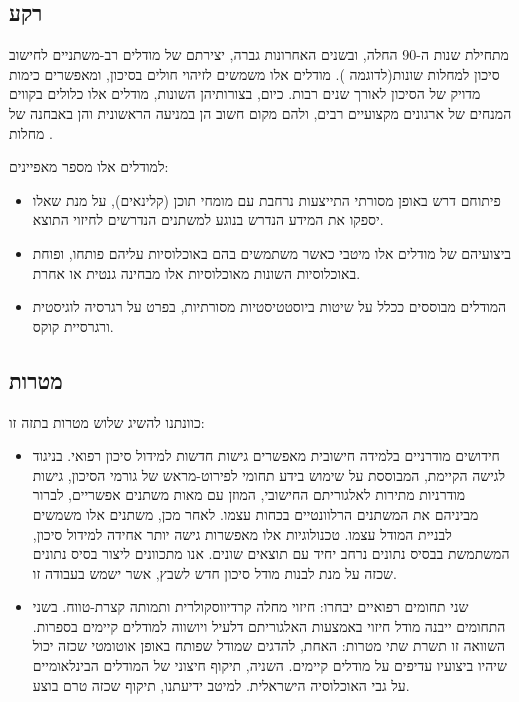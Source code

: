 \documentclass[a4paper,12pt]{article}
\begin{document}
	\begin{hebrew}
		\subsection*{רקע}
		מתחילת שנות ה-90 החלה, ובשנים האחרונות גברה, יצירתם של מודלים רב-משתניים לחישוב סיכון למחלות שונות(לדוגמה \cite{Wilson1998,Conroy2003,DAgostino2008}). מודלים אלו משמשים לזיהוי חולים בסיכון, ומאפשרים כימות מדויק של הסיכון לאורך שנים רבות\cite{Goff2014}. כיום, בצורותיהן השונות, מודלים אלו כלולים בקווים המנחים של ארגונים מקצועיים רבים, ולהם מקום חשוב הן במניעה הראשונית והן באבחנה של מחלות \cite{Graham2007,Goff2014}.
			
			למודלים אלו מספר מאפיינים:
			\begin{itemize}
				\item פיתוחם דרש באופן מסורתי התייצעות נרחבת עם מומחי תוכן (קלינאים), על מנת שאלו יספקו את המידע הנדרש בנוגע למשתנים הנדרשים לחיזוי התוצא.
				\item ביצועיהם של מודלים אלו מיטבי כאשר משתמשים בהם באוכלוסיות עליהם פותחו, ופוחת באוכלוסיות השונות מאוכלוסיות אלו מבחינה גנטית או אחרת\cite{DAgostino2001,Bastuji-Garin2002,DeFilippis2015}.
				
				\item המודלים מבוססים ככלל על שיטות ביוסטטיסטיות מסורתיות, בפרט על רגרסיה לוגיסטית ורגרסיית קוקס.
				
			\end{itemize}
				
		\subsection*{מטרות}
			כוונתנו להשיג שלוש מטרות בתזה זו:
			\begin{itemize}
				\item חידושים מודרניים בלמידה חישובית מאפשרים גישות חדשות למידול סיכון רפואי\cite{Obermeyer2016}. בניגוד לגישה הקיימת, המבוססת על שימוש בידע תחומי לפירוט-מראש של גורמי הסיכון, גישות מודרניות מתירות לאלגוריתם החישובי, המוזן עם מאות משתנים אפשריים, לברור מביניהם את המשתנים הרלוונטיים בכחות עצמו\cite{Weng2017}. לאחר מכן, משתנים אלו משמשים לבניית המודל עצמו. טכנולוגיות אלו מאפשרות גישה יותר אחידה למידול סיכון, המשתמשת בבסיס נתונים נרחב יחיד עם תוצאים שונים\cite{Rajkomar2018}. אנו מתכוונים ליצור בסיס נתונים שכזה על מנת לבנות מודל סיכון חדש  לשבץ, אשר ישמש בעבודה זו.
				\item שני תחומים רפואיים יבחרו: חיזוי מחלה קרדיווסקולרית ותמותה קצרת-טווח. בשני התחומים ייבנה מודל חיזוי באמצעות האלגוריתם דלעיל ויושווה למודלים קיימים בספרות. השוואה זו תשרת שתי מטרות: האחת, להדגים שמודל שפותח באופן אוטומטי שכזה יכול שיהיו ביצועיו עדיפים על מודלים קיימים.  השניה, תיקוף חיצוני של המודלים הבינלאומיים על גבי האוכלוסיה הישראלית. למיטב ידיעתנו, תיקוף שכזה טרם בוצע.
			\end{itemize}
		

\end{hebrew}
\end{document}

